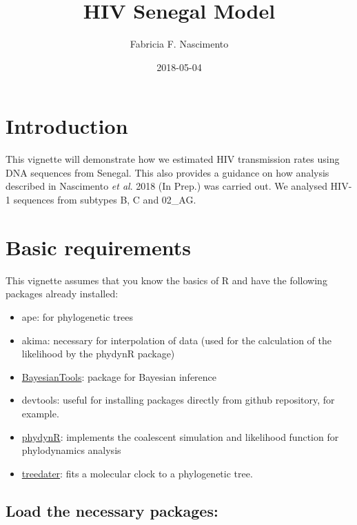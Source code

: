 \documentclass[12pt,]{article}
\title{HIV Senegal Model}
\author{Fabricia F. Nascimento}
\date{2018-05-04}
\providecommand{\tightlist}{%
  \setlength{\itemsep}{0pt}\setlength{\parskip}{0pt}}
\begin{document}
\maketitle

\hypertarget{introduction}{%
\section{Introduction}\label{introduction}}

This vignette will demonstrate how we estimated HIV transmission rates
using DNA sequences from Senegal. This also provides a guidance on how
analysis described in Nascimento \emph{et al}. 2018 (In Prep.) was
carried out. We analysed HIV-1 sequences from subtypes B, C and 02\_AG.

\hypertarget{basic-requirements}{%
\section{Basic requirements}\label{basic-requirements}}

This vignette assumes that you know the basics of R and have the
following packages already installed:

\begin{itemize}
\tightlist
\item
  ape: for phylogenetic trees
\item
  akima: necessary for interpolation of data (used for the calculation
  of the likelihood by the phydynR package)
\item
  \href{\%22https://github.com/florianhartig/BayesianTools\%22}{BayesianTools}:
  package for Bayesian inference
\item
  devtools: useful for installing packages directly from github
  repository, for example.
\item
  \href{\%22https://github.com/emvolz-phylodynamics/phydynR\%22}{phydynR}:
  implements the coalescent simulation and likelihood function for
  phylodynamics analysis
\item
  \href{\%22https://github.com/emvolz/treedater\%22}{treedater}: fits a
  molecular clock to a phylogenetic tree.
\end{itemize}

\hypertarget{load-the-necessary-packages}{%
\subsection{Load the necessary
packages:}\label{load-the-necessary-packages}}
\end{document}
